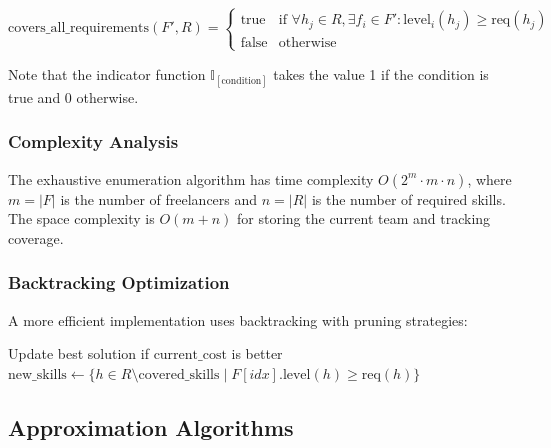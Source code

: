 \documentclass[12pt,a4paper]{article}
\begin{document}
\[
\text{covers\_all\_requirements}(F', R) = 
\begin{cases}
	\text{true} & \text{if } \forall h_j \in R, \exists f_i \in F': \text{level}_i(h_j) \geq \text{req}(h_j) \\
	\text{false} & \text{otherwise}
\end{cases}
\]

Note that the indicator function $\mathbb{I}_{[\text{condition}]}$ takes the value 1 if the condition is true and 0 otherwise.

\subsubsection{Complexity Analysis}
The exhaustive enumeration algorithm has time complexity $O(2^m \cdot m \cdot n)$, where $m = |F|$ is the number of freelancers and $n = |R|$ is the number of required skills. The space complexity is $O(m + n)$ for storing the current team and tracking coverage.

\subsubsection{Backtracking Optimization}
A more efficient implementation uses backtracking with pruning strategies:

\begin{algorithm}[H]
	\caption{Backtracking with Pruning}
	\label{alg:backtracking}
	\begin{algorithmic}[1]
		\State Update best solution if $\text{current\_cost}$ is better
		\State \Return
		\EndIf
		\State \Return
		\EndIf
		\State {}
		\State {}
		\State {}
		\State $\text{new\_skills} \gets \{h \in R \setminus \text{covered\_skills} \mid F[idx].\text{level}(h) \geq \text{req}(h)\}$
		\State {}
		\EndIf
		\EndFunction
	\end{algorithmic}
\end{algorithm}

\subsection{Approximation Algorithms}
\label{subsec:approximation-algorithms}
\end{document}
